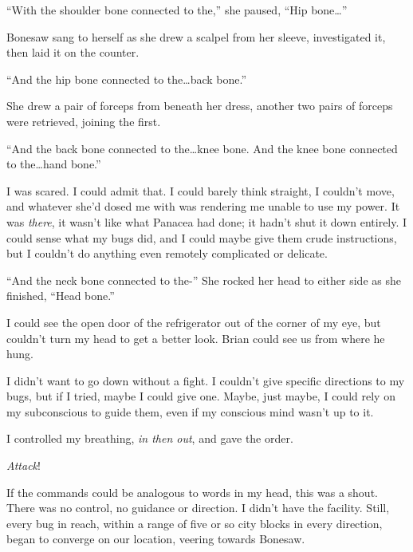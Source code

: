 





``With the shoulder bone connected to the,'' she paused, ``Hip bone\ldots''



Bonesaw sang to herself as she drew a scalpel from her sleeve, investigated it, then laid it on the counter.



``And the hip bone connected to the\ldots back bone.''



She drew a pair of forceps from beneath her dress, another two pairs of forceps were retrieved, joining the first.



``And the back bone connected to the\ldots knee bone.  And the knee bone connected to the\ldots hand bone.''



I was scared.  I could admit that.  I could barely think straight, I couldn't move, and whatever she'd dosed me with was rendering me unable to use my power.  It was \emph{there}, it wasn't like what Panacea had done; it hadn't shut it down entirely.  I could sense what my bugs did, and I could maybe give them crude instructions, but I couldn't do anything even remotely complicated or delicate.



``And the neck bone connected to the-'' She rocked her head to either side as she finished, ``Head bone.''



I could see the open door of the refrigerator out of the corner of my eye, but couldn't turn my head to get a better look.  Brian could see us from where he hung.



I didn't want to go down without a fight.  I couldn't give specific directions to my bugs, but if I tried, maybe I could give one.  Maybe, just maybe, I could rely on my subconscious to guide them, even if my conscious mind wasn't up to it.



I controlled my breathing, \emph{in then out}, and gave the order.



\emph{Attack}!



If the commands could be analogous to words in my head, this was a shout.  There was no control, no guidance or direction.  I didn't have the facility.  Still, every bug in reach, within a range of five or so city blocks in every direction, began to converge on our location, veering towards Bonesaw.



